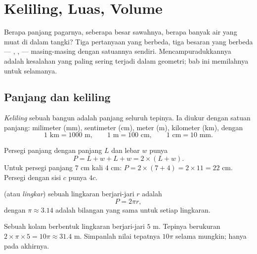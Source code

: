 \chapter{Keliling, Luas, Volume}\label{ch:g6:measure}

Berapa panjang pagarnya, seberapa besar sawahnya, berapa banyak air
yang muat di dalam tangki? Tiga pertanyaan yang berbeda, tiga besaran
yang berbeda --- , ,  --- masing-masing dengan
satuannya sendiri. Mencampuradukkannya adalah kesalahan yang paling
sering terjadi dalam geometri; bab ini memilahnya untuk selamanya.

\section{Panjang dan keliling}

\begin{definition}[Keliling]\label{def:g6:measure:perimeter}
\emph{Keliling} sebuah bangun adalah panjang seluruh
tepinya. Ia diukur dengan satuan panjang: milimeter (mm), sentimeter
(cm), meter (m), kilometer (km), dengan
\[
1 \text{ km} = 1000 \text{ m}, \qquad
1 \text{ m} = 100 \text{ cm}, \qquad
1 \text{ cm} = 10 \text{ mm}.
\]
\end{definition}

\begin{example}\label{ex:g6:measure:perimeter}
Persegi panjang dengan panjang $L$ dan lebar $w$ punya 
\[
P = L + w + L + w = 2 \times (L + w).
\]
Untuk persegi panjang $7$ cm kali $4$ cm: $P = 2 \times (7 + 4) = 2 \times 11 =
22$ cm. Persegi dengan sisi $c$ punya  $4c$.
\end{example}

\begin{proposition}\label{prop:g6:measure:circle}
 (atau \emph{lingkar}) sebuah lingkaran berjari-jari $r$ adalah
\[
P = 2 \pi r ,
\]
dengan $\pi \approx 3.14$ adalah bilangan yang sama untuk setiap lingkaran.
\end{proposition}
\admitted

\begin{example}
Sebuah kolam berbentuk lingkaran berjari-jari $5$ m. Tepinya berukuran
$2 \times \pi \times 5 = 10\pi \approx 31.4$ m. Simpanlah nilai
tepatnya $10\pi$ selama mungkin;  hanya pada akhirnya.
\end{example}

